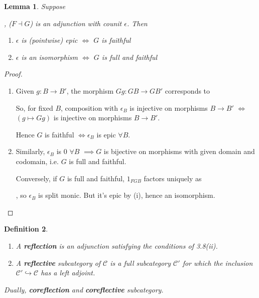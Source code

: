 \documentclass[a4paper]{article}
\newtheorem{definition}{Definition}
\newtheorem{lemma}[definition]{Lemma}
\numberwithin{definition}{section}
\begin{document}
\begin{lemma}
	Suppose
	,
	($F \dashv G$) is an adjunction with counit $\epsilon$.
	Then
	\begin{enumerate}[label=\roman*.]
		\item $\epsilon$ is (pointwise) epic $\iff$ $G$ is faithful
		\item $\epsilon$ is an isomorphism $\iff$ $G$ is full and faithful
	\end{enumerate} 
\end{lemma}
\begin{proof}
	\begin{enumerate}[label=\roman*.]
		\item Given $g: B \to B'$,
		the morphism $Gg: GB \to GB'$ corresponds to
		\begin{center}
		\end{center}
		So, for fixed $B$,
		composition with $\epsilon_B$ is injective on morphisms $B \to B'$
		$\iff$ $(g \mapsto Gg)$ is injective on morphisms $B \to B'$.
		
		Hence $G$ is faithful $\iff \epsilon_B$ is epic $\forall B$.
		
		\item Similarly, $\epsilon_B$ is 0 $\forall B$
		$\implies G$ is bijective on morphisms with given domain and codomain,
		i.e. $G$ is full and faithful.
		
		Conversely, if $G$ is full and faithful,
		$1_{FGB}$ factors uniquely as \newline
		,
		so $\epsilon_B$ is split monic.
		But it's epic by (i), hence an isomorphism.
	\end{enumerate}
\end{proof}

\begin{definition}
	\begin{enumerate}[label=\roman*.]
		\item A \textbf{reflection} is an adjunction satisfying the conditions of 3.8(ii).
		\item A \textbf{reflective} subcategory of $\mathcal{C}$ is a full subcategory $\mathcal{C}'$
		for which the inclusion $\mathcal{C}' \hookrightarrow \mathcal{C}$ has a left adjoint.
	\end{enumerate}
	
	Dually, \textbf{coreflection} and \textbf{coreflective} subcategory.
\end{definition}
\end{document}
